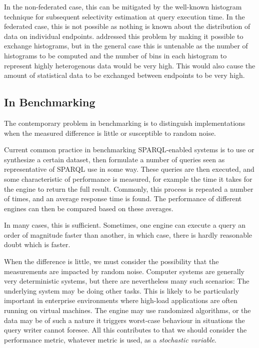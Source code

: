 \documentclass{llncs}
\begin{document}
In the non-federated case, this can be mitigated by the well-known
histogram technique for subsequent selectivity estimation at query
execution time. In the federated case, this is not possible as nothing
is known about the distribution of data on individual
endpoints. \cite{5337556} addressed this problem by making it possible
to exchange histograms, but in the general case this is untenable as
the number of histograms to be computed and the number
of bins in each histogram to represent highly heterogenous data would
be very high. This would also cause the amount of statistical data to
be exchanged between endpoints to be very high.

\subsection{In Benchmarking}

The contemporary problem in benchmarking is to distinguish
implementations when the measured difference is little or susceptible
to random noise.

Current common practice in benchmarking SPARQL-enabled systems is to
use or synthesize a certain dataset, then formulate a number of
queries seen as representative of SPARQL use in some way. These
queries are then executed, and some characteristic of performance is
measured, for example the time it takes for the engine to return the
full result. Commonly, this process is repeated a number of times, and
an average response time is found. The performance of different
engines can then be compared based on these averages.

In many cases, this is sufficient. Sometimes, one engine can execute a
query an order of magnitude faster than another, in which case, there
is hardly reasonable doubt which is faster.

When the difference is little, we must consider the possibility that
the measurements are impacted by random noise. Computer systems are
generally very deterministic systems, but there are nevertheless many
such scenarios: The underlying system may be doing other tasks. This
is likely to be particularly important in enterprise environments
where high-load applications are often running on virtual
machines. The engine may use randomized algorithms, or the data may be
of such a nature it triggers worst-case behaviour in situations the
query writer cannot foresee. All this contributes to that we should
consider the performance metric, whatever metric is used, as a
\emph{stochastic variable}.
\end{document}
